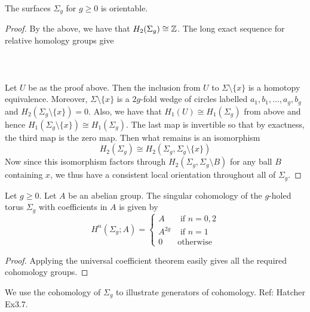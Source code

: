 \documentclass[a4paper]{article}
\begin{document}
\begin{crl}{}{} The surfaces $\Sigma_g$ for $g\geq 0$ is orientable. \tcbline
\begin{proof}
By the above, we have that $H_2(\Sigma_g)\cong\mathbb{Z}$. The long exact sequence for relative homology groups give \\~\\
\\~\\
Let $U$ be as the proof above. Then the inclusion from $U$ to $\Sigma\setminus\{x\}$ is a homotopy equivalence. Moreover, $\Sigma\setminus\{x\}$ is a $2g$-fold wedge of circles labelled $a_1,b_1,\dots,a_g,b_g$ and $H_2(\Sigma_g\setminus\{x\})=0$. Also, we have that $H_1(U)\cong H_1(\Sigma_g)$ from above and hence $H_1(\Sigma_g\setminus\{x\})\cong H_1(\Sigma_g)$. The last map is invertible so that by exactness, the third map is the zero map. Then what remains is an isomorphism $$H_2(\Sigma_g)\cong H_2(\Sigma_g,\Sigma_g\setminus\{x\})$$ Now since this isomorphism factors through $H_2(\Sigma_g,\Sigma_g\setminus B)$ for any ball $B$ containing $x$, we thus have a consistent local orientation throughout all of $\Sigma_g$. 
\end{proof}
\end{crl}

\begin{prp}{}{} Let $g\geq 0$. Let $A$ be an abelian group. The singular cohomology of the $g$-holed torus $\Sigma_g$ with coefficients in $A$ is given by $$H^n(\Sigma_g;A)=\begin{cases}
A & \text{ if } n=0,2\\
A^{2g} & \text{ if } n=1\\
0 & \text{otherwise}
\end{cases}$$ \tcbline
\begin{proof}
Applying the universal coefficient theorem easily gives all the required cohomology groups. 
\end{proof}
\end{prp}

We use the cohomology of $\Sigma_g$ to illustrate generators of cohomology. Ref: Hatcher Ex3.7. 
\end{document}

